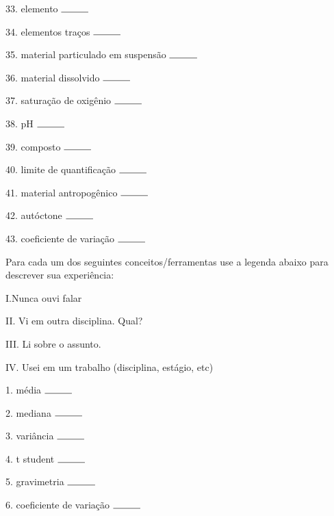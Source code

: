 \documentclass[a4paper,10pt]{article}
\begin{document}
\begin{multicols}{2}
33. elemento $\rule{1cm}{0.15mm}$

34. elementos traços $\rule{1cm}{0.15mm}$

35. material particulado em suspensão $\rule{1cm}{0.15mm}$

36. material dissolvido $\rule{1cm}{0.15mm}$

37. saturação de oxigênio $\rule{1cm}{0.15mm}$

38. pH $\rule{1cm}{0.15mm}$

39. composto $\rule{1cm}{0.15mm}$

40. limite de quantificação $\rule{1cm}{0.15mm}$

41. material antropogênico $\rule{1cm}{0.15mm}$

42. autóctone $\rule{1cm}{0.15mm}$

43. coeficiente de variação $\rule{1cm}{0.15mm}$



\end{multicols}

Para cada um dos seguintes conceitos/ferramentas use a legenda abaixo para descrever sua experiência:

I.Nunca ouvi falar

II. Vi em outra disciplina. Qual?

III. Li sobre o assunto.

IV. Usei em um trabalho (disciplina, estágio, etc)

1. média $\rule{1cm}{0.15mm}$

2. mediana $\rule{1cm}{0.15mm}$

3. variância $\rule{1cm}{0.15mm}$

4. t student $\rule{1cm}{0.15mm}$

5. gravimetria $\rule{1cm}{0.15mm}$

6. coeficiente de variação $\rule{1cm}{0.15mm}$


\end{document}
